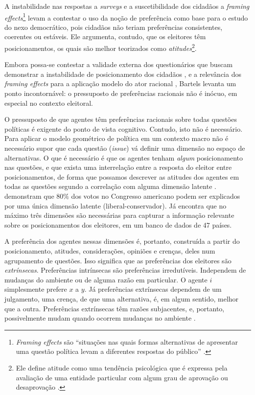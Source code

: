 A instabilidade nas respostas a \textit{surveys} e a suscetibilidade dos
cidadãos a \textit{framing effects}\footnote{\textit{Framing effects} são
  ``situações nas quais formas alternativas de apresentar uma questão política
  levam a diferentes respostas do público'' \cite[p.56]{bartels2003democracy}.}
levam  a contestar o uso da noção de
preferência como base para o estudo do nexo democrático, pois cidadãos não
teriam preferências consistentes, coerentes ou estáveis. Ele argumenta, contudo,
que os eleitores têm posicionamentos, os quais são melhor teorizados como
\textit{atitudes}\footnote{ Ele define atitude como uma tendência psicológica
  que é expressa pela avaliação de uma entidade particular com algum grau de
  aprovação ou desaprovação \cite[p.52]{bartels2003democracy}.}.

Embora possa-se contestar a validade externa dos questionários que buscam
demonstrar a instabilidade de posicionamento dos cidadãos
\cite{druckman2012public}, e a relevância dos \textit{framing effects} para a
aplicação modelo do ator racional \cite[p. 107]{gintis2016individuality},
Bartels levanta um ponto incontornável: o pressuposto de preferências racionais
não é inócuo, em especial no contexto eleitoral.

O pressuposto de que agentes têm preferências racionais sobre todas questões
políticas é exigente do ponto de vista cognitivo. Contudo, isto não é
necessário. Para aplicar o modelo geométrico de política em um contexto macro
não é necessário supor que cada questão (\textit{issue}) vá definir uma dimensão
no espaço de alternativas. O que é necessário é que os agentes tenham
\textit{algum} posicionamento nas questões, e que exista uma interrelação entre
a resposta do eleitor entre posicionamentos, de forma que possamos descrever as
atitudes dos agentes em todas as questões segundo a correlação com alguma
dimensão latente \cite{poole2005spatial,laver2014measuring}.
 demonstram que $80\%$ dos votos no Congresso
americano podem ser explicados por uma única dimensão latente
(liberal-conservador). Já  encontra que no máximo
três dimensões são necessárias para capturar a informação relevante sobre os
posicionamentos dos eleitores, em um banco de dados de 47 países.

A preferência dos agentes nessas dimensões é, portanto, construída a partir do
posicionamento, atitudes, considerações, opiniões e crenças, deles num
agrupamento de questões. Isso significa que as preferências dos eleitores são
\textit{extrínsecas}. Preferências intrínsecas são preferências irredutíveis.
Independem de mudanças do ambiente ou de alguma razão em particular. O agente
\(i\) simplesmente prefere \(x\) a \(y\). Já preferências extrínsecas dependem
de um julgamento, uma crença, de que uma alternativa, é, em algum sentido, melhor
que a outra. Preferências extrínsecas têm razões subjacentes, e, portanto,
possivelmente mudam quando ocorrem mudanças no ambiente \cite{liu2010wright,
  binmore2008rational}.


